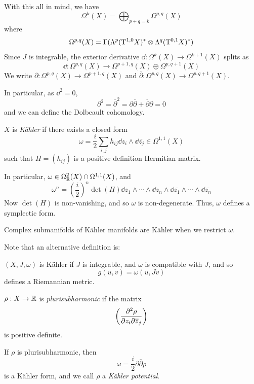 \documentclass{article}
\begin{document}
With this all in mind, we have
\[\Omega^k(X) = \bigoplus_{p + q = k}\Omega^{p, q}(X)\]
where
\[\Omega^{p, q}(X) = \Gamma(\Lambda^p(\mathrm{T}^{1, 0}X)^* \otimes \Lambda^q(\mathrm{T}^{0, 1}X)^*)\]
Since \(J\) is integrable, the exterior derivative \(\dd : \Omega^k(X) \to \Omega^{k+1}(X)\) splits as
\[\dd : \Omega^{p, q}(X) \to \Omega^{p+1,q}(X) \oplus \Omega^{p, q+1}(X)\]
We write \(\partial : \Omega^{p, q}(X) \to \Omega^{p+1, q}(X)\) and \(\overline\partial : \Omega^{p, q}(X) \to \Omega^{p, q+1}(X)\).

In particular, as \(\dd^2 = 0\),
\[\partial^2 = \overline\partial^2 = \partial\overline\partial + \overline\partial\partial = 0\]
and we can define the Dolbeault cohomology.

\begin{definition}
    [K\"ahler]
    \(X\) is \emph{K\"ahler} if there exists a closed form
    \[\omega = \frac{i}{2}\sum_{i, j}h_{ij}\dd z_i \wedge \dd\overline{z_j} \in \Omega^{1, 1}(X)\]
    such that \(H = (h_{ij})\) is a positive definition Hermitian matrix.
\end{definition}

In particular, \(\omega \in \Omega^2_{\mathbb{R}}(X) \cap \Omega^{1, 1}(X)\), and
\[\omega^n = \left(\frac{i}{2}\right)^n\det(H)\dd z_1 \wedge \cdots \wedge \dd z_n \wedge \dd \overline{z_1} \wedge \cdots \wedge \dd \overline{z_n}\]
Now \(\det(H)\) is non-vanishing, and so \(\omega\) is non-degenerate. Thus, \(\omega\) defines a symplectic form.

\begin{remark}
    Complex submanifolds of K\"ahler manifolds are K\"ahler when we restrict \(\omega\).
\end{remark}

Note that an alternative definition is:

\begin{definition}
    [K\"ahler]

    \((X, J, \omega)\) is K\"ahler if \(J\) is integrable, and \(\omega\) is compatible with \(J\), and so
    \[g(u, v) = \omega(u, Jv)\]
    defines a Riemannian metric.
\end{definition}

\begin{definition}
    [plurisubharmonic]
    \(\rho : X \to \mathbb{R}\) is \emph{plurisubharmonic} if the matrix
    \[\left(\pdv[2]{\rho}{z_i}{\overline{z}_j}\right)\]
    is positive definite.
\end{definition}

If \(\rho\) is plurisubharmonic, then
\[\omega = \frac{i}{2}\partial\overline\partial\rho\]
is a K\"ahler form, and we call \(\rho\) a \emph{K\"ahler potential}.
\end{document}
